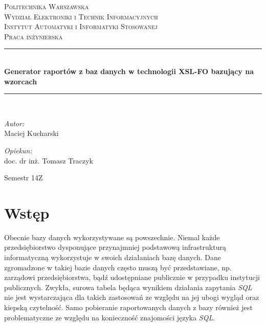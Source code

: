 \documentclass[11pt,a4paper]{article}
\newcommand{\HRule}{\rule{\linewidth}{0.5mm}}
\begin{document}
\begin{titlepage}
\begin{center}
\textsc{\LARGE Politechnika Warszawska}\\[0.5cm]
\textsc{\Large Wydział Elektroniki i Technik Informacyjnych}\\
\textsc{\Large Instytut Automatyki i Informatyki Stosowanej}\\[1.5cm]

\textsc{\Large Praca inżynierska} \\[0.5cm]
\HRule \\[0.4cm]
{ \huge \bfseries Generator raportów z baz danych w technologii XSL-FO  bazujący na wzorcach \\[0.4cm]}
\HRule \\[1.5cm]

\begin{minipage} {0.4\textwidth}
\begin{flushleft} \large
\emph{Autor:}\\
 Maciej Kucharski 
\end{flushleft}
\end{minipage}
\begin{minipage} {0.4\textwidth}
\begin{flushright} \large

\emph{Opiekun:}\\
doc. dr inż. Tomasz Traczyk

\end{flushright}
\end{minipage}	
\vfill
\large Semestr 14Z

	\end{center}
\end{titlepage}
 
\tableofcontents
\newpage

\section{Wstęp} \label{sec:wst}
Obecnie bazy danych wykorzystywane są powszechnie. Niemal każde przedsiębiorstwo dysponujące przynajmniej podstawową infrastrukturą informatyczną wykorzystuje w swoich działaniach bazę danych. Dane zgromadzone w takiej bazie danych często muszą być przedstawiane, np. zarządowi przedsiębiorstwa, bądź udostępniane publicznie w przypadku instytucji publicznych. Zwykła, surowa tabela będąca wynikiem działania zapytania \emph{SQL} nie jest wystarczająca dla takich zastosowań ze względu na jej ubogi wygląd oraz kiepską czytelność.  Samo pobieranie raportowanych danych z bazy również jest problematyczne ze względu na konieczność znajomości języka \emph{SQL}. 
\end{document}
